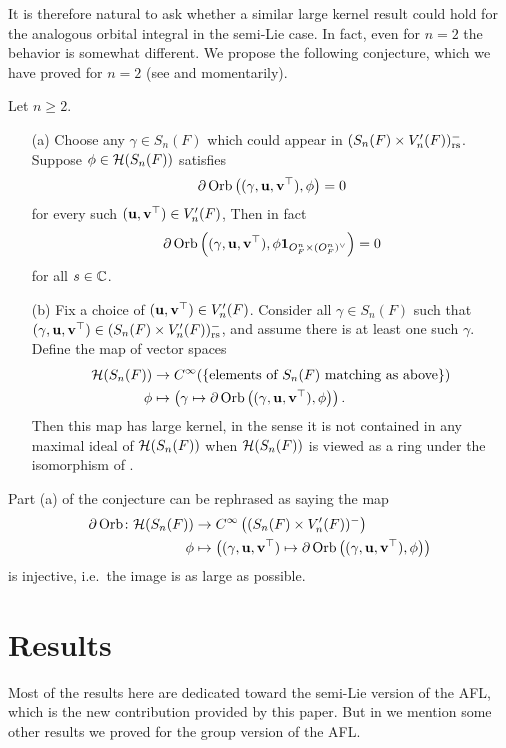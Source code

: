 It is therefore natural to ask whether a similar large kernel result
could hold for the analogous orbital integral in the semi-Lie case.
In fact, even for $n=2$ the behavior is somewhat different.
We propose the following conjecture, which we have proved for $n = 2$
(see  and  momentarily).
\begin{conjecture}
  \label{conj:kernel_semi_lie}
  Let $n \ge 2$.
  \begin{enumerate}
  \item[(a)]
  Choose any $\gamma \in S_n(F)$ which could appear in $(S_n(F) \times V'_n(F))_{\mathrm{rs}}^-$.
  Suppose $\phi \in \mathcal H(S_n(F))$ satisfies
  \[ \partial \operatorname{Orb} \left({(\gamma, \mathbf u, \mathbf v^\top)}, \phi \right) = 0 \]
  for every such $(\mathbf u, \mathbf v^\top) \in V'_n(F)$,
  Then in fact
  \[ \partial \operatorname{Orb} \left({(\gamma, \mathbf u, \mathbf v^\top)}, \phi \mathbf{1}_{O_F^n \times (O_F^n)^\vee} \right) = 0 \]
  for all $s \in \mathbb C$.

  \item[(b)]
  Fix a choice of $(\mathbf u, \mathbf v^\top) \in V'_n(F)$.
  Consider all $\gamma \in S_n(F)$ such that ${(\gamma, \mathbf u, \mathbf v^\top)} \in (S_n(F) \times V'_n(F))_{\mathrm{rs}}^-$,
  and assume there is at least one such $\gamma$.
  Define the map of vector spaces
  \begin{align*}
    \mathcal H(S_n(F))
    &\to C^\infty( \left\{ \text{elements of } S_n(F) \text{ matching as above} \right\} ) \\
      \phi &\mapsto \left( \gamma \mapsto \partial \operatorname{Orb} \left( {(\gamma, \mathbf u, \mathbf v^\top)}, \phi \right) \right).
  \end{align*}
  Then this map has large kernel,
  in the sense it is not contained in any maximal ideal of $\mathcal H(S_n(F))$
  when $\mathcal H(S_n(F))$ is viewed as a ring under the isomorphism of .
  \end{enumerate}
\end{conjecture}

Part (a) of the conjecture can be rephrased as saying the map
\begin{align*}
  \partial\operatorname{Orb} \colon \mathcal H(S_n(F)) &\to C^\infty\left( (S_n(F) \times V'_n(F))^- \right) \\
  \phi &\mapsto \left( {(\gamma, \mathbf u, \mathbf v^\top)} \mapsto \partial \operatorname{Orb} \left({(\gamma, \mathbf u, \mathbf v^\top)}, \phi \right) \right)
\end{align*}
is injective, i.e.\ the image is as large as possible.

\section{Results}
Most of the results here are dedicated toward the semi-Lie version of the AFL,
which is the new contribution provided by this paper.
But in  we mention some other results
we proved for the group version of the AFL.

